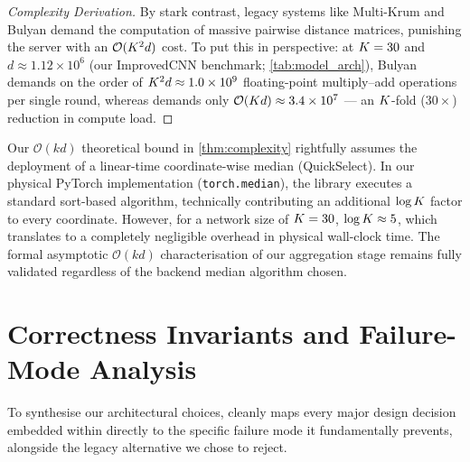 \documentclass[../main.tex]{subfiles}
\begin{document}
\begin{proof}[Complexity Derivation]
By stark contrast, legacy systems like Multi-Krum and Bulyan demand the computation of massive pairwise distance matrices, punishing the server with an $\mathcal{O}(K^2 d)$ cost. To put this in perspective: at $K = 30$ and $d \approx 1.12 \times 10^6$ (our ImprovedCNN benchmark; \cref{tab:model_arch}), Bulyan demands on the order of $K^2 d \approx 1.0 \times 10^9$ floating-point multiply--add operations per single round, whereas \aegis{} demands only $\mathcal{O}\!\left(K d\right) \approx 3.4 \times 10^7$ — an $K$-fold ($30\times$) reduction in compute load.
\end{proof}

\begin{remark}
Our $\mathcal{O}(kd)$ theoretical bound in \cref{thm:complexity} rightfully assumes the deployment of a linear-time coordinate-wise median (QuickSelect). In our physical PyTorch implementation (\texttt{torch.median}), the library executes a standard sort-based algorithm, technically contributing an additional $\log K$ factor to every coordinate. However, for a network size of $K = 30$, $\log K \approx 5$, which translates to a completely negligible overhead in physical wall-clock time. The formal asymptotic $\mathcal{O}(kd)$ characterisation of our aggregation stage remains fully validated regardless of the backend median algorithm chosen.
\end{remark}

\section{Correctness Invariants and Failure-Mode Analysis}
\label{sec:aegis_correctness}

To synthesise our architectural choices,  cleanly maps every major design decision embedded within \aegis{} directly to the specific failure mode it fundamentally prevents, alongside the legacy alternative we chose to reject.
\end{document}
